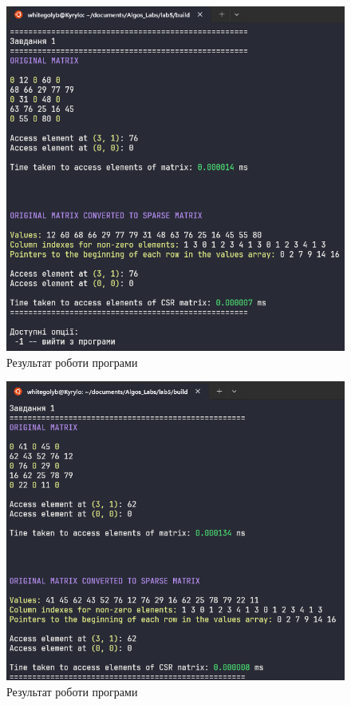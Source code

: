 \begin{figure}[h!]
    \centering
    \includegraphics[width=12cm]{reports/algos/lab5/assets/1.png}
    \caption{Результат роботи програми}
\end{figure}

\begin{figure}[h!]
    \centering
    \includegraphics[width=12cm]{reports/algos/lab5/assets/2.png}
    \caption{Результат роботи програми}
\end{figure}

